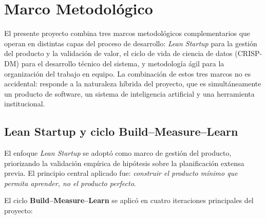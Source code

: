 \chapter{Marco Metodológico}

El presente proyecto combina tres marcos metodológicos complementarios que
operan en distintas capas del proceso de desarrollo: \textit{Lean Startup}
para la gestión del producto y la validación de valor, el ciclo de vida de
ciencia de datos (CRISP-DM) para el desarrollo técnico del sistema, y
metodología ágil para la organización del trabajo en equipo. La combinación
de estos tres marcos no es accidental: responde a la naturaleza híbrida del
proyecto, que es simultáneamente un producto de software, un sistema de
inteligencia artificial y una herramienta institucional.

\section{Lean Startup y ciclo Build–Measure–Learn}

El enfoque \textit{Lean Startup} se adoptó como marco de gestión del producto,
priorizando la validación empírica de hipótesis sobre la planificación extensa
previa. El principio central aplicado fue: \textit{construir el producto mínimo
que permita aprender, no el producto perfecto}.

El ciclo \textbf{Build--Measure--Learn} se aplicó en cuatro iteraciones
principales del proyecto:

